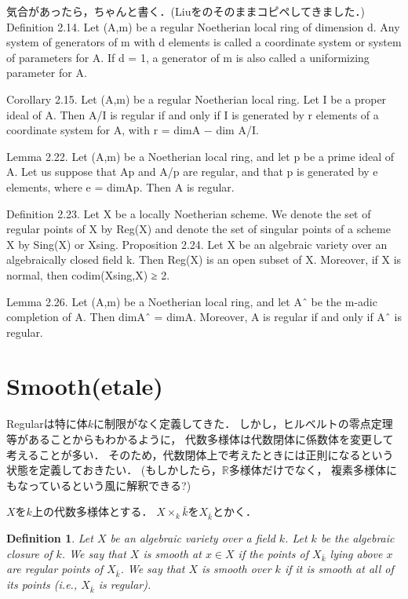 \documentclass{ujarticle}
\newtheorem{dfn}[thm]{Definition}
\begin{document}
気合があったら，ちゃんと書く．(Liuをのそのままコピペしてきました．)
Definition 2.14. Let (A,m) be a regular Noetherian local ring of dimension d.
Any system of generators of m with d elements is called a coordinate system or
system of parameters for A. If d = 1, a generator of m is also called a uniformizing
parameter for A.


Corollary 2.15. Let (A,m) be a regular Noetherian local ring. Let I be a proper
ideal of A. Then A/I is regular if and only if I is generated by r elements of a
coordinate system for A, with r = dimA − dim A/I.


Lemma 2.22. Let (A,m) be a Noetherian local ring, and let p be a prime ideal
of A. Let us suppose that Ap and A/p are regular, and that p is generated by e
elements, where e = dimAp. Then A is regular.

Definition 2.23. Let X be a locally Noetherian scheme. We denote the set of
regular points of X by Reg(X) and denote the set of singular points of a scheme
X by Sing(X) or Xsing.
Proposition 2.24. Let X be an algebraic variety over an algebraically closed
field k. Then Reg(X) is an open subset of X. Moreover, if X is normal, then
codim(Xsing,X) ≥ 2.

Lemma 2.26. Let (A,m) be a Noetherian local ring, and let Aˆ be the m-adic
completion of A. Then dimAˆ = dimA. Moreover, A is regular if and only if Aˆ
is regular.

\section{Smooth(etale)}
\label{Smooth(etale)}

Regularは特に体$k$に制限がなく定義してきた．
しかし，ヒルベルトの零点定理等があることからもわかるように，
代数多様体は代数閉体に係数体を変更して考えることが多い．
そのため，代数閉体上で考えたときには正則になるという状態を定義しておきたい．
(もしかしたら，$\mathbb{R}$多様体だけでなく，
複素多様体にもなっているという風に解釈できる?)

$X$を$k$上の代数多様体とする．
$X \times_{k} \bar{k}$を$X_{\bar{k}}$とかく．

\begin{dfn}
 Let $X$ be an algebraic variety over a field $k$. Let $k$ be the
algebraic closure of $k$. We say that $X$ is smooth at $x \in X$ if the points of $X_{\bar{k}}$
lying above $x$ are regular points of $X_{\bar{k}}$. We say that $X$ is smooth over $k$ if it is
smooth at all of its points (i.e., $X_{\bar{k}}$ is regular).
\end{dfn}
\end{document}
